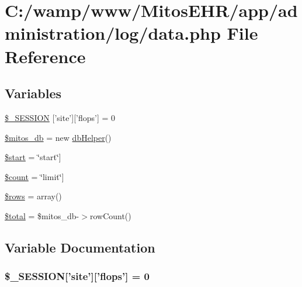 \hypertarget{administration_2log_2data_8php}{\section{\-C\-:/wamp/www/\-Mitos\-E\-H\-R/app/administration/log/data.php \-File \-Reference}
\label{administration_2log_2data_8php}
}
\subsection*{\-Variables}
\begin{DoxyCompactItemize}
\item 
\hyperlink{administration_2log_2data_8php_a99fda8552a3e58235643b79f5af3ded8}{\$\-\_\-\-S\-E\-S\-S\-I\-O\-N} \mbox{[}'site'\mbox{]}\mbox{[}'flops'\mbox{]} = 0
\item 
\hyperlink{administration_2log_2data_8php_ab5d961f93efe4e2e8d8374f01dd6c65a}{\$mitos\-\_\-db} = new \hyperlink{classdb_helper}{db\-Helper}()
\item 
\hyperlink{administration_2log_2data_8php_a50a00e7de77365e00b117e73aa82fb9b}{\$start} = \char`\"{}start\char`\"{}\mbox{]}
\item 
\hyperlink{administration_2log_2data_8php_af789423037bbc89dc7c850e761177570}{\$count} = \char`\"{}limit\char`\"{}\mbox{]}
\item 
\hyperlink{administration_2log_2data_8php_ace2ec39e7df3899fa8df9640ec274b03}{\$rows} = array()
\item 
\hyperlink{administration_2log_2data_8php_a241b818f48030b628685b2e5119c5624}{\$total} = \$mitos\-\_\-db-\/$>$row\-Count()
\end{DoxyCompactItemize}


\subsection{\-Variable \-Documentation}
\hypertarget{administration_2log_2data_8php_a99fda8552a3e58235643b79f5af3ded8}{
\subsubsection[{\$\-\_\-\-S\-E\-S\-S\-I\-O\-N}]{\setlength{\rightskip}{0pt plus 5cm}\$\-\_\-\-S\-E\-S\-S\-I\-O\-N\mbox{[}'site'\mbox{]}\mbox{[}'flops'\mbox{]} = 0}}\label{administration_2log_2data_8php_a99fda8552a3e58235643b79f5af3ded8}


